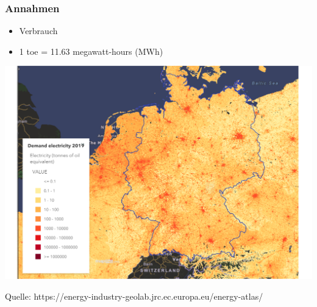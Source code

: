 \documentclass[aspectratio=169,t]{beamer}
\begin{document}
\begin{frame}
	\frametitle{Annahmen}
	\vspace*{0mm}
	\begin{minipage}{1\linewidth}
		\begin{minipage}{.3\linewidth}
			\begin{itemize}
				\item Verbrauch
				\item 1 toe = 11.63 megawatt-hours (MWh)
			\end{itemize}
		\end{minipage}
		\hfill
		\begin{minipage}{.7\linewidth}
			\centering
			\includegraphics[width=.9\linewidth]{Deutschland_Bedarf.png}
			
		\end{minipage}
	\end{minipage}	

\vspace*{4mm}
	Quelle: https://energy-industry-geolab.jrc.ec.europa.eu/energy-atlas/
	
\end{frame}



\begin{frame}
	\frametitle{}
	
	\vspace*{-2mm}
	\vspace*{0mm}
\end{frame}
	
\end{document}
